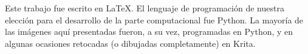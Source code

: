 \documentclass[a4paper,oneside,11pt]{extreport}
\begin{document}
\maketitle







\begin{center}
Este trabajo fue escrito en \LaTeX.
El lenguaje de programación de nuestra elección
para el desarrollo de la parte computacional 
fue Python.
La mayoría de las imágenes aquí presentadas fueron,
a su vez, programadas en Python, y en algunas ocasiones
retocadas (o dibujadas completamente) en Krita. 
\end{center}


\tableofcontents











\end{document}
